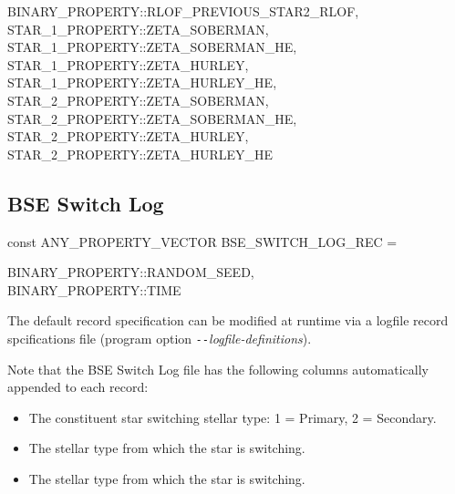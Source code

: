 \begin{minipage}{\dimexpr\textwidth-2em}
    BINARY\_PROPERTY::RLOF\_PREVIOUS\_STAR2\_RLOF, \\
    STAR\_1\_PROPERTY::ZETA\_SOBERMAN, \\
    STAR\_1\_PROPERTY::ZETA\_SOBERMAN\_HE, \\
    STAR\_1\_PROPERTY::ZETA\_HURLEY, \\
    STAR\_1\_PROPERTY::ZETA\_HURLEY\_HE, \\
    STAR\_2\_PROPERTY::ZETA\_SOBERMAN, \\
    STAR\_2\_PROPERTY::ZETA\_SOBERMAN\_HE, \\
    STAR\_2\_PROPERTY::ZETA\_HURLEY, \\
    STAR\_2\_PROPERTY::ZETA\_HURLEY\_HE
\end{minipage}
\par\rcb{;}

\newpage
\subsection{BSE Switch Log}\label{sec:BSESwitchLog}

const ANY\_PROPERTY\_VECTOR BSE\_SWITCH\_LOG\_REC = \lcb

\hfill
\begin{minipage}{\dimexpr\textwidth-2em}
    BINARY\_PROPERTY::RANDOM\_SEED, \\
    BINARY\_PROPERTY::TIME
\end{minipage}
\par\rcb{;}

\bigskip
The default record specification can be modified at runtime via a logfile record spcifications file (program option \textit{\texttt{-{}-}logfile-definitions}).

Note that the BSE Switch Log file has the following columns automatically appended to each record:

\begin{itemize}
    \item{The constituent star switching stellar type: 1 = Primary, 2 = Secondary.}
    \item{The stellar type from which the star is switching.}
    \item{The stellar type from which the star is switching.}
\end{itemize}

